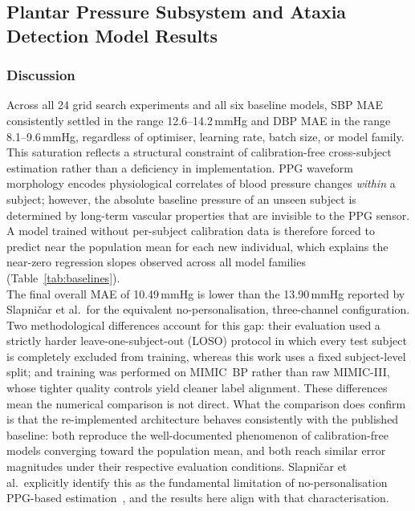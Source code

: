 \subsection{Plantar Pressure Subsystem and Ataxia Detection Model Results}
\label{subsec:plantar_pressure_ataxia_results}
\subsubsection{Discussion}
\label{subsubsec:interpretation}

\noindent Across all 24 grid search experiments and all six baseline models, SBP MAE consistently
settled in the range 12.6--14.2\,mmHg and DBP MAE in the range 8.1--9.6\,mmHg, regardless
of optimiser, learning rate, batch size, or model family.
This saturation reflects a structural constraint of calibration-free cross-subject estimation
rather than a deficiency in implementation.
PPG waveform morphology encodes physiological correlates of blood pressure changes
\emph{within} a subject; however, the absolute baseline pressure of an unseen subject is
determined by long-term vascular properties that are invisible to the PPG sensor.
A model trained without per-subject calibration data is therefore forced to predict near the
population mean for each new individual, which explains the near-zero regression slopes
observed across all model families (Table~\ref{tab:baselines}). \\

\noindent The final overall MAE of 10.49\,mmHg is lower than the 13.90\,mmHg reported by
Slap\-ni\v{c}ar et al.\ for the equivalent no-personalisation, three-channel configuration.
Two methodological differences account for this gap: their evaluation used a strictly harder
leave-one-subject-out (LOSO) protocol in which every test subject is completely excluded from
training, whereas this work uses a fixed subject-level split; and training was performed on
MIMIC~BP rather than raw MIMIC-III, whose tighter quality controls yield cleaner label
alignment.
These differences mean the numerical comparison is not direct.
What the comparison does confirm is that the re-implemented architecture behaves
consistently with the published baseline: both reproduce the well-documented phenomenon
of calibration-free models converging toward the population mean, and both reach similar
error magnitudes under their respective evaluation conditions.
Slap\-ni\v{c}ar et al.\ explicitly identify this as the fundamental limitation of
no-personalisation PPG-based estimation~\cite{Slapnicar2019}, and the results here align
with that characterisation. \\

